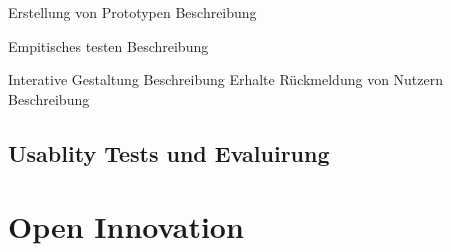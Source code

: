 		 Erstellung von Prototypen  Beschreibung 

		Empitisches testen  Beschreibung 

		Interative Gestaltung  Beschreibung 
		 Erhalte Rückmeldung von Nutzern  Beschreibung 






\subsection{Usablity Tests und Evaluirung}


\section{Open Innovation}




